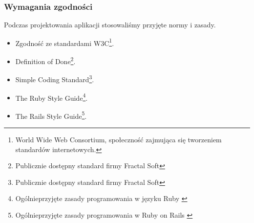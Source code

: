   \subsubsection{Wymagania zgodności}
    Podczas projektowania aplikacji stosowaliśmy przyjęte normy i zasady.
    \begin{itemize}
      \item Zgodność ze standardami W3C\footnote{World Wide Web Consortium, społeczność zajmująca się tworzeniem standardów internetowych.}.
      \item Definition of Done\footnote{Publicznie dostępny standard firmy Fractal Soft\cite{dod}}.
      \item Simple Coding Standard\footnote{Publicznie dostępny standard firmy Fractal Soft\cite{scs}}.
      \item The Ruby Style Guide\footnote{Ogólnieprzyjęte zasady programowania w języku Ruby \cite{ruby_style_guide}}.
      \item The Rails Style Guide\footnote{Ogólnieprzyjęte zasady programowania w Ruby on Rails \cite{rails_style_guide}}.
    \end{itemize}
